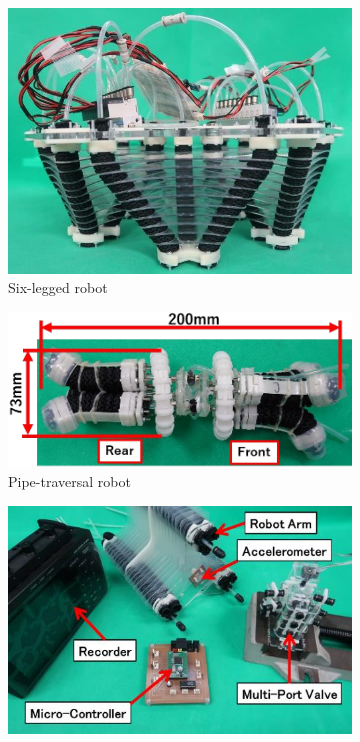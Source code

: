 \documentclass[english,12pt,a4paper,pdftex,eng,utf8]{aaltothesis}
\begin{document}
\begin{figure}[h]
  \centering
  \begin{subfigure}[t]{0.28\textwidth}
    \centering
    \includegraphics[width=\textwidth]{assets/six_legged_robot}
    \caption{Six-legged robot~\cite{Hase2020}}\label{sfig:six_legged_robot}
  \end{subfigure}
  \begin{subfigure}[t]{0.33\textwidth}
    \centering
    \includegraphics[width=\textwidth]{assets/pipe_robot}
    \caption{Pipe-traversal robot~\cite{Shinohara2020}}\label{sfig:pipe_robot}
  \end{subfigure}
  \begin{subfigure}[t]{0.29\textwidth}
    \centering
    \includegraphics[width=\textwidth]{assets/bending_servo_valve}

\end{subfigure}
\end{figure}
\end{document}
